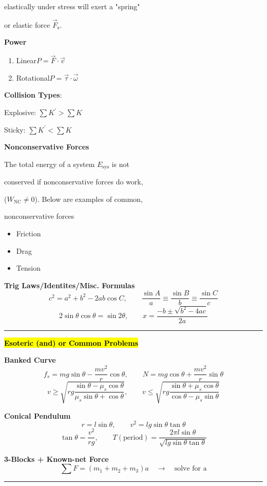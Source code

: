 \documentclass[	DIV=calc,%
							paper=a4,%
							fontsize=11pt,%
							twocolumn]{scrartcl} %
\newcommand{\hformbar}[1]{\vspace{5pt}\hrule\vspace{10pt}} %
\newcommand{\formdesc}[1]{\noindent\textbf{#1}}
\begin{document}
elastically under stress will exert a "spring" 

or elastic force $\vec F_\text{s}$. 

\textbf{Power}
\begin{enumerate}
    \item Linear\qquad\qquad$P=\vec F\cdot\vec v$
    \item Rotational\qquad$P=\vec\tau\cdot\vec\omega$
\end{enumerate}

\textbf{Collision Types}:

\qquad Explosive: $\sum K^\prime > \sum K$

\qquad Sticky: $\sum K^\prime < \sum K$

\textbf{Nonconservative Forces}

The total energy of a system $E_\text{sys}$ is not 

conserved if nonconservative forces do work, 

($W_{\text{NC}}\ne 0$). Below are examples of common, 

nonconservative forces
\begin{itemize}
    \item Friction
    \item Drag
    \item Tension
\end{itemize}

\textbf{Trig Laws/Identites/Misc. Formulas}
$$c^2=a^2+b^2-2ab\cos C,\qquad\frac{\sin A}{a}\equiv\frac{\sin B}{b}\equiv\frac{\sin C}{c}$$
$$2\sin\theta\cos\theta=\sin 2\theta,\qquad x=\frac{-b\pm\sqrt{b^2-4ac}}{2a}$$

\hformbar{}

\formdesc{\hl{Esoteric (and) or Common Problems}}

\textbf{Banked Curve}
$$f_s=mg\sin\theta-\frac{mv^2}{r}\cos\theta,\qquad N=mg\cos\theta+\frac{mv^2}{r}\sin\theta$$
$$v\ge\sqrt{rg\frac{\sin\theta-\mu_s\cos\theta}{\mu_s\sin\theta+\cos\theta}},\qquad v\le\sqrt{rg\frac{\sin\theta+\mu_s\cos\theta}{\cos\theta-\mu_s\sin\theta}}$$

\textbf{Conical Pendulum}
$$r=l\sin\theta,\qquad v^2=lg\sin\theta\tan\theta$$
$$\tan\theta=\frac{v^2}{rg},\qquad T(\text{period})=\frac{2\pi l\sin\theta}{\sqrt{lg\sin\theta\tan\theta}}$$

\textbf{3-Blocks + Known-net Force}
$$\sum F=(m_1+m_2+m_3)a\quad\rightarrow\quad\text{solve for a}$$
\hformbar{}

\textbf{}
\end{document}
